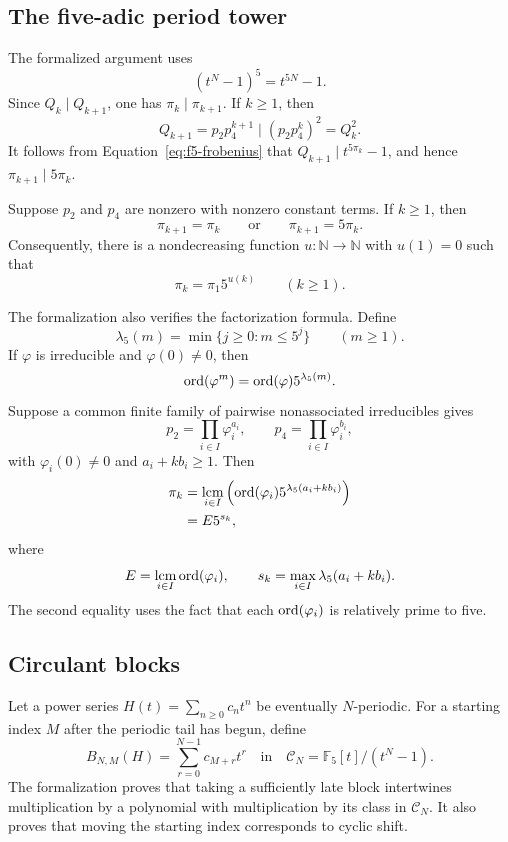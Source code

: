 \subsection{The five-adic period tower}

The formalized argument uses
\begin{equation}\label{eq:f5-frobenius}
(t^N-1)^5=t^{5N}-1.
\end{equation}
Since $Q_k\mid Q_{k+1}$, one has $\pi_k\mid\pi_{k+1}$. If $k\geqslant1$,
then
\[
Q_{k+1}=p_2p_4^{k+1}\mid(p_2p_4^k)^2=Q_k^2.
\]
It follows from Equation~\eqref{eq:f5-frobenius} that
$Q_{k+1}\mid t^{5\pi_k}-1$, and hence $\pi_{k+1}\mid5\pi_k$.

\begin{prop}\label{prop:f5-ratio}
Suppose $p_2$ and $p_4$ are nonzero with nonzero constant terms. If
$k\geqslant1$, then
\[
\pi_{k+1}=\pi_k
\qquad\text{or}\qquad
\pi_{k+1}=5\pi_k.
\]
Consequently, there is a nondecreasing function $u\colon\mathbb N\to\mathbb
N$ with $u(1)=0$ such that
\[
\pi_k=\pi_1 5^{u(k)}
\qquad(k\geqslant1).
\]
\end{prop}

The formalization also verifies the factorization formula. Define
\[
\lambda_5(m)=\min\{j\geqslant0:m\leqslant5^j\}
\qquad(m\geqslant1).
\]
If $\varphi$ is irreducible and $\varphi(0)\ne0$, then
\begin{equation}\label{eq:f5-prime-power}
\operatorname{ord}(\varphi^m)=\operatorname{ord}(\varphi)5^{\lambda_5(m)}.
\end{equation}
Suppose a common finite family of pairwise nonassociated irreducibles gives
\[
p_2=\prod_{i\in I}\varphi_i^{a_i},
\qquad
p_4=\prod_{i\in I}\varphi_i^{b_i},
\]
with $\varphi_i(0)\ne0$ and $a_i+kb_i\geqslant1$. Then
\begin{align}
\pi_k
&=\mathop{\operatorname{lcm}}_{i\in I}
  \left(\operatorname{ord}(\varphi_i)5^{\lambda_5(a_i+kb_i)}\right)\label{eq:f5-lcm}\\
&=E5^{s_k},\label{eq:f5-explicit}
\end{align}
where
\[
E=\mathop{\operatorname{lcm}}_{i\in I}\operatorname{ord}(\varphi_i),
\qquad
s_k=\max_{i\in I}\lambda_5(a_i+kb_i).
\]
The second equality uses the fact that each $\operatorname{ord}(\varphi_i)$ is relatively
prime to five.

\subsection{Circulant blocks}

Let a power series $H(t)=\sum_{n\geqslant0}c_nt^n$ be eventually
$N$-periodic. For a starting index $M$ after the periodic tail has begun,
define
\[
B_{N,M}(H)=\sum_{r=0}^{N-1}c_{M+r}t^r
\quad\text{in}\quad
\mathcal C_N=\mathbb F_5[t]/(t^N-1).
\]
The formalization proves that taking a sufficiently late block intertwines
multiplication by a polynomial with multiplication by its class in
$\mathcal C_N$. It also proves that moving the starting index corresponds to
cyclic shift.

